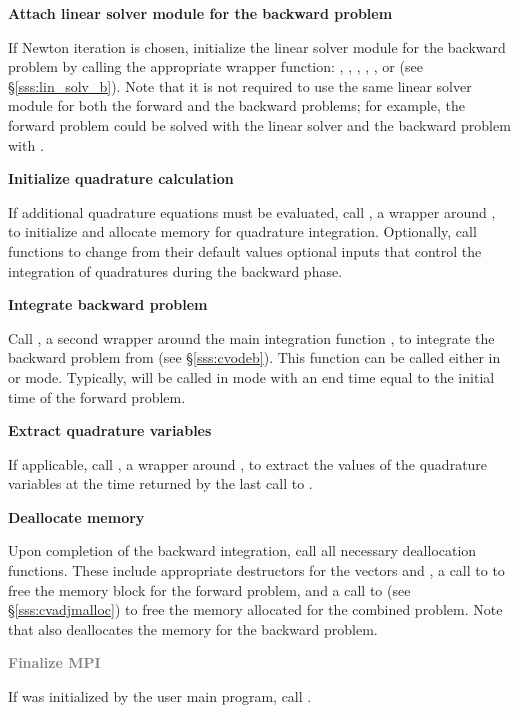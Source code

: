 \begin{Steps}
\item \label{i:lin_solverB}
  {\bf Attach linear solver module for the backward problem}

  If Newton iteration is chosen, initialize the linear solver module 
  for the backward problem by calling the appropriate wrapper
  function: , , ,
  , , or  (see \S\ref{sss:lin_solv_b}). 
  Note that it is not required
  to use the same linear solver module for both the forward and the 
  backward problems; for example, the forward problem could be solved
  with the {\cvdense} linear solver and the backward problem with {\cvspgmr}.

\item \label{i:quadB}
  {\bf Initialize quadrature calculation}

  If additional quadrature equations must be evaluated, 
  call , a wrapper around ,
  to initialize and allocate memory for quadrature integration.
  Optionally, call  functions to change from their
  default values optional inputs that control the integration of
  quadratures during the backward phase.

\item
  {\bf Integrate backward problem}

  Call , a second wrapper around the {\cvodes} main integration
  function , to integrate the backward problem from 
  (see \S\ref{sss:cvodeb}). This function can be called either in 
  or  mode. Typically,  will be called in 
  mode with an end time equal to the initial time of the forward problem.

\item \label{i:back_end}
  {\bf Extract quadrature variables}

  If applicable, call , a wrapper around ,
  to extract the values of the quadrature variables at the time returned
  by the last call to .

\item
  {\bf Deallocate memory}

  Upon completion of the backward integration, call all necessary deallocation
  functions. These include appropriate destructors for the vectors 
   and , a call to  to free the {\cvodes} memory block 
  for the forward problem, and a call to  (see \S\ref{sss:cvadjmalloc}) to free 
  the memory allocated for the combined problem. 
  Note that  also deallocates the {\cvodes} memory for the backward problem.

\item
  \textcolor{gray}{\bf Finalize MPI}

  {\p} If {\mpi} was initialized by the user main program, call .

\end{Steps}

